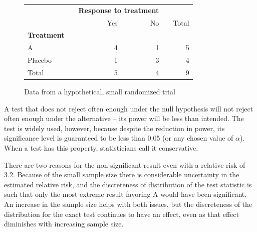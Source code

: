 \begin{figure}[h]
	\centering
	\begin{tabular}{ll rrr r}
		\hline
        & & \multicolumn{2}{c}{\textbf{Response to treatment}} &  \\
        & \hspace{2mm} & Yes & No &
        \hspace{2mm} & Total \\
        \textbf{Treatment} & & & & & \\
        \hline
        A & & 4 & 1 & & 5    \\
        Placebo &	& 1 & 3 & & 4    \\
        Total & & 5 & 4 & & 9 \\
		\hline
	\end{tabular}
	\caption{Data from a hypothetical, small randomized trial}
    \label{figure:smallSampleFisher}
\end{figure}	

A test that does not reject often enough  under the null hypothesis will not reject often enough under the alternative -- its power will be less than intended.  The test is widely used, however, because despite the reduction in power, its significance level is guaranteed to be less than 0.05 (or any chosen value of $\alpha$).  When a test has this property, statisticians call it conservative.

There are two reasons for the non-significant result even with a relative risk of 3.2.  Because of the small sample size there is considerable uncertainty in the estimated relative risk, and the discreteness of distribution of the test statistic is such that only the most extreme result favoring A would have been significant.  An increase in the sample size helps with both issues, but the discreteness of the distribution for the exact test continues to have an effect, even as that effect diminishes with increasing sample size.



